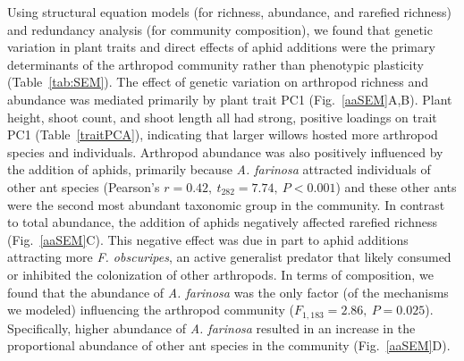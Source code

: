 \documentclass[11pt]{article}
\begin{document}
Using structural equation models (for richness, abundance, and rarefied
richness) and redundancy analysis (for community composition), we found
that genetic variation in plant traits and direct effects of aphid additions
were the primary determinants of the arthropod community rather than
phenotypic plasticity (Table~\ref{tab:SEM}). The effect of genetic variation
on arthropod richness and abundance was mediated primarily by plant
trait PC1 (Fig.~\ref{aaSEM}A,B). Plant height, shoot count, and shoot length all
had strong, positive loadings on trait PC1 (Table~\ref{traitPCA}), indicating that
larger willows hosted more arthropod species and individuals. Arthropod
abundance was also positively influenced by the addition of aphids,
primarily because \textit{A. farinosa} attracted individuals of other ant species
(Pearson's \(r=0.42,\ t_{282}=7.74,\ P<0.001\)) and these other ants were the second most
abundant taxonomic group in the community. In contrast to total
abundance, the addition of aphids negatively affected rarefied richness
(Fig.~\ref{aaSEM}C). This negative effect was due in part to aphid additions
attracting more \textit{F. obscuripes}, an active generalist predator that
likely consumed or inhibited the colonization of other arthropods. In
terms of composition, we found that the abundance of \textit{A. farinosa}
was the only factor (of the mechanisms we modeled) influencing the
arthropod community (\(F_{1,183}=2.86,\ P=0.025\)). Specifically, higher abundance
of \textit{A. farinosa} resulted in an increase in the proportional
abundance of other ant species in the community (Fig.~\ref{aaSEM}D).
\end{document}
